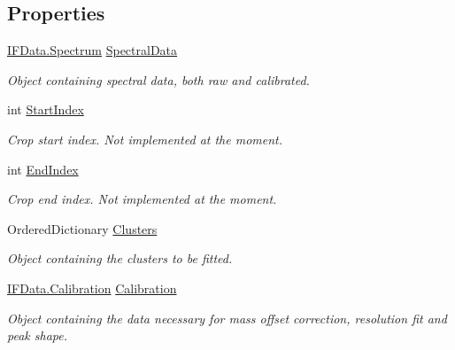 \subsection*{Properties}
\begin{DoxyCompactItemize}
\item 
\hyperlink{class_isotope_fit_1_1_i_f_data_1_1_spectrum}{I\+F\+Data.\+Spectrum} \hyperlink{class_isotope_fit_1_1_workspace_a1d6cc2dd07cbfe920da9f1bffc9b32c2}{Spectral\+Data}
\begin{DoxyCompactList}\small\item\em Object containing spectral data, both raw and calibrated. \end{DoxyCompactList}\item 
int \hyperlink{class_isotope_fit_1_1_workspace_a04248959f6df286a8f641effe0119ea0}{Start\+Index}
\begin{DoxyCompactList}\small\item\em Crop start index. Not implemented at the moment. \end{DoxyCompactList}\item 
int \hyperlink{class_isotope_fit_1_1_workspace_af51c32e7bc1645aaf8a24e94c96bc013}{End\+Index}
\begin{DoxyCompactList}\small\item\em Crop end index. Not implemented at the moment. \end{DoxyCompactList}\item 
Ordered\+Dictionary \hyperlink{class_isotope_fit_1_1_workspace_a13958fbe0adace21990cb1eabbd421e9}{Clusters}
\begin{DoxyCompactList}\small\item\em Object containing the clusters to be fitted. \end{DoxyCompactList}\item 
\hyperlink{class_isotope_fit_1_1_i_f_data_1_1_calibration}{I\+F\+Data.\+Calibration} \hyperlink{class_isotope_fit_1_1_workspace_a0ed1cfd6701db24de84f4ba67eed0442}{Calibration}
\begin{DoxyCompactList}\small\item\em Object containing the data necessary for mass offset correction, resolution fit and peak shape. \end{DoxyCompactList}\item 

\end{DoxyCompactItemize}

